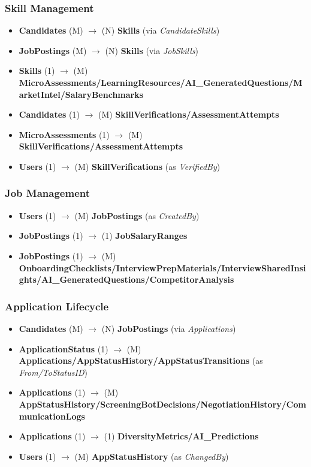 \documentclass[11pt,a4paper]{article}
\begin{document}
\subsubsection*{Skill Management}
\begin{itemize}
    \item \textbf{Candidates} (M) $\rightarrow$ (N) \textbf{Skills} (via \textit{CandidateSkills})
    \item \textbf{JobPostings} (M) $\rightarrow$ (N) \textbf{Skills} (via \textit{JobSkills})
    \item \textbf{Skills} (1) $\rightarrow$ (M) \textbf{MicroAssessments/LearningResources/AI\_GeneratedQuestions/MarketIntel/SalaryBenchmarks}
    \item \textbf{Candidates} (1) $\rightarrow$ (M) \textbf{SkillVerifications/AssessmentAttempts}
    \item \textbf{MicroAssessments} (1) $\rightarrow$ (M) \textbf{SkillVerifications/AssessmentAttempts}
    \item \textbf{Users} (1) $\rightarrow$ (M) \textbf{SkillVerifications} (as \textit{VerifiedBy})
\end{itemize}

\subsubsection*{Job Management}
\begin{itemize}
    \item \textbf{Users} (1) $\rightarrow$ (M) \textbf{JobPostings} (as \textit{CreatedBy})
    \item \textbf{JobPostings} (1) $\rightarrow$ (1) \textbf{JobSalaryRanges}
    \item \textbf{JobPostings} (1) $\rightarrow$ (M) \textbf{OnboardingChecklists/InterviewPrepMaterials/InterviewSharedInsights/AI\_GeneratedQuestions/CompetitorAnalysis}
\end{itemize}

\subsubsection*{Application Lifecycle}
\begin{itemize}
    \item \textbf{Candidates} (M) $\rightarrow$ (N) \textbf{JobPostings} (via \textit{Applications})
    \item \textbf{ApplicationStatus} (1) $\rightarrow$ (M) \textbf{Applications/AppStatusHistory/AppStatusTransitions} (as \textit{From/ToStatusID})
    \item \textbf{Applications} (1) $\rightarrow$ (M) \textbf{AppStatusHistory/ScreeningBotDecisions/NegotiationHistory/CommunicationLogs}
    \item \textbf{Applications} (1) $\rightarrow$ (1) \textbf{DiversityMetrics/AI\_Predictions}
    \item \textbf{Users} (1) $\rightarrow$ (M) \textbf{AppStatusHistory} (as \textit{ChangedBy})
\end{itemize}
\end{document}
